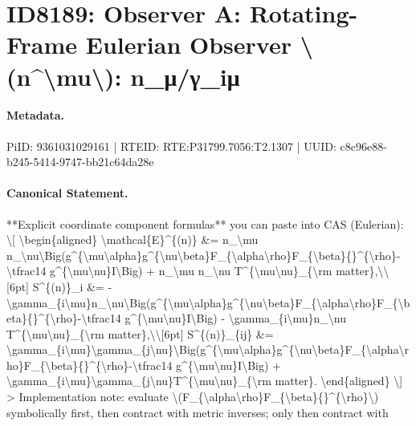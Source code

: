 \section*{ID8189: Observer A: Rotating-Frame Eulerian Observer \textbackslash{}(n\textasciicircum{}\textbackslash{}mu\textbackslash{}): n\_μ/γ\_iμ}
\paragraph{Metadata.}
PiID: 9361031029161 | RTEID: RTE:P31799.7056:T2.1307 | UUID: c8c96e88-b245-5414-9747-bb21c64da28e

\paragraph{Canonical Statement.}
**Explicit coordinate component formulas** you can paste into CAS (Eulerian): \textbackslash{}[ \textbackslash{}begin\{aligned\} \textbackslash{}mathcal\{E\}\textasciicircum{}\{(n)\} \&= n\_\textbackslash{}mu n\_\textbackslash{}nu\textbackslash{}Big(g\textasciicircum{}\{\textbackslash{}mu\textbackslash{}alpha\}g\textasciicircum{}\{\textbackslash{}nu\textbackslash{}beta\}F\_\{\textbackslash{}alpha\textbackslash{}rho\}F\_\{\textbackslash{}beta\}\{\}\textasciicircum{}\{\textbackslash{}rho\}-\textbackslash{}tfrac14 g\textasciicircum{}\{\textbackslash{}mu\textbackslash{}nu\}I\textbackslash{}Big) + n\_\textbackslash{}mu n\_\textbackslash{}nu T\textasciicircum{}\{\textbackslash{}mu\textbackslash{}nu\}\_\{\textbackslash{}rm matter\},\textbackslash{}\textbackslash{}[6pt] S\textasciicircum{}\{(n)\}\_i \&= -\textbackslash{}gamma\_\{i\textbackslash{}mu\}n\_\textbackslash{}nu\textbackslash{}Big(g\textasciicircum{}\{\textbackslash{}mu\textbackslash{}alpha\}g\textasciicircum{}\{\textbackslash{}nu\textbackslash{}beta\}F\_\{\textbackslash{}alpha\textbackslash{}rho\}F\_\{\textbackslash{}beta\}\{\}\textasciicircum{}\{\textbackslash{}rho\}-\textbackslash{}tfrac14 g\textasciicircum{}\{\textbackslash{}mu\textbackslash{}nu\}I\textbackslash{}Big) - \textbackslash{}gamma\_\{i\textbackslash{}mu\}n\_\textbackslash{}nu T\textasciicircum{}\{\textbackslash{}mu\textbackslash{}nu\}\_\{\textbackslash{}rm matter\},\textbackslash{}\textbackslash{}[6pt] S\textasciicircum{}\{(n)\}\_\{ij\} \&= \textbackslash{}gamma\_\{i\textbackslash{}mu\}\textbackslash{}gamma\_\{j\textbackslash{}nu\}\textbackslash{}Big(g\textasciicircum{}\{\textbackslash{}mu\textbackslash{}alpha\}g\textasciicircum{}\{\textbackslash{}nu\textbackslash{}beta\}F\_\{\textbackslash{}alpha\textbackslash{}rho\}F\_\{\textbackslash{}beta\}\{\}\textasciicircum{}\{\textbackslash{}rho\}-\textbackslash{}tfrac14 g\textasciicircum{}\{\textbackslash{}mu\textbackslash{}nu\}I\textbackslash{}Big) + \textbackslash{}gamma\_\{i\textbackslash{}mu\}\textbackslash{}gamma\_\{j\textbackslash{}nu\}T\textasciicircum{}\{\textbackslash{}mu\textbackslash{}nu\}\_\{\textbackslash{}rm matter\}. \textbackslash{}end\{aligned\} \textbackslash{}] > Implementation note: evaluate \textbackslash{}(F\_\{\textbackslash{}alpha\textbackslash{}rho\}F\_\{\textbackslash{}beta\}\{\}\textasciicircum{}\{\textbackslash{}rho\}\textbackslash{}) symbolically first, then contract with metric inverses; only then contract with 